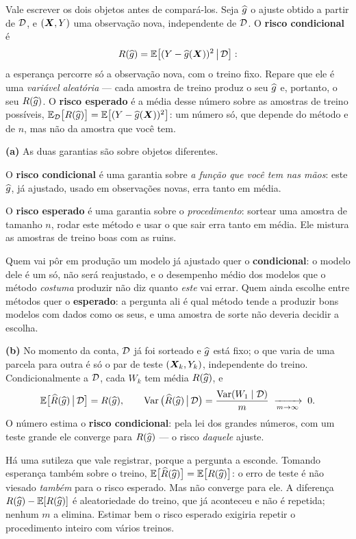 \begin{solucao}
Vale escrever os dois objetos antes de compará-los. Seja $\widehat{g}$ o ajuste obtido a
partir de $\mathcal{D}$, e $(\bm{X},Y)$ uma observação nova, independente de $\mathcal{D}$. O
\textbf{risco condicional} é
\[
  R(\widehat{g})=\mathbb{E}\big[(Y-\widehat{g}(\bm{X}))^2\,\big|\,\mathcal{D}\big]:
\]
a esperança percorre só a observação nova, com o treino fixo. Repare que ele é uma
\emph{variável aleatória} --- cada amostra de treino produz o seu $\widehat{g}$ e,
portanto, o seu $R(\widehat{g})$. O \textbf{risco esperado} é a média desse número
sobre as amostras de treino possíveis,
$\mathbb{E}_{\mathcal{D}}\big[R(\widehat{g})\big]=\mathbb{E}\big[(Y-\widehat{g}(\bm{X}))^2\big]$: um número só, que
depende do método e de $n$, mas não da amostra que você tem.

\smallskip
\textbf{(a)} As duas garantias são sobre objetos diferentes.

O \textbf{risco condicional} é uma garantia sobre \emph{a função que você tem nas
mãos}: este $\widehat{g}$, já ajustado, usado em observações novas, erra tanto em média.

O \textbf{risco esperado} é uma garantia sobre o \emph{procedimento}: sortear uma
amostra de tamanho $n$, rodar este método e usar o que sair erra tanto em média. Ele
mistura as amostras de treino boas com as ruins.

Quem vai pôr em produção um modelo já ajustado quer o \textbf{condicional}: o modelo
dele é um só, não será reajustado, e o desempenho médio dos modelos que o método
\emph{costuma} produzir não diz quanto \emph{este} vai errar. Quem ainda escolhe
entre métodos quer o \textbf{esperado}: a pergunta ali é qual método tende a produzir
bons modelos com dados como os seus, e uma amostra de sorte não deveria decidir a
escolha.

\smallskip
\textbf{(b)} No momento da conta, $\mathcal{D}$ já foi sorteado e $\widehat{g}$ está fixo; o
que varia de uma parcela para outra é só o par de teste $(\bm{X}_k,Y_k)$, independente do
treino. Condicionalmente a $\mathcal{D}$, cada $W_k$ tem média $R(\widehat{g})$, e
\[
  \mathbb{E}\big[\widehat{R}(\widehat{g})\,\big|\,\mathcal{D}\big]=R(\widehat{g}),
  \qquad
  \operatorname{Var}\big(\widehat{R}(\widehat{g})\,\big|\,\mathcal{D}\big)=\frac{\operatorname{Var}(W_1\mid\mathcal{D})}{m}
  \;\xrightarrow[m\to\infty]{}\;0 .
\]
O número estima o \textbf{risco condicional}: pela lei dos grandes números, com um
teste grande ele converge para $R(\widehat{g})$ --- o risco \emph{daquele} ajuste.

Há uma sutileza que vale registrar, porque a pergunta a esconde. Tomando esperança
também sobre o treino, $\mathbb{E}\big[\widehat{R}(\widehat{g})\big]=\mathbb{E}\big[R(\widehat{g})\big]$: o
erro de teste é não viesado \emph{também} para o risco esperado. Mas não converge para
ele. A diferença $R(\widehat{g})-\mathbb{E}[R(\widehat{g})]$ é aleatoriedade do treino, que já
aconteceu e não é repetida; nenhum $m$ a elimina. Estimar bem o risco esperado exigiria
repetir o procedimento inteiro com vários treinos.


\end{solucao}
